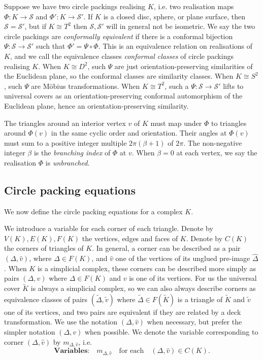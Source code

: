 \documentclass[12pt]{amsart}
\numberwithin{equation}{section}
\theoremstyle{named}
\newcommand{\To}{\longrightarrow}
\begin{document}
 Suppose we have two circle packings realising $K$, i.e. two realisation maps $\Phi \colon K \To \mathcal{S}$ and $\Phi' \colon K \To \mathcal{S}'$. If $K$ is a closed disc, sphere, or plane surface, then $\mathcal{S} = \mathcal{S}'$, but if $K \cong T^2$ then $\mathcal{S},\mathcal{S'}$ will in general not be isometric. We say the two circle packings are \emph{conformally equivalent} if there is a conformal bijection $\Psi \colon \mathcal{S} \To \mathcal{S'}$ such that $\Phi' = \Psi \circ \Phi$. This is an equivalence relation on realisations of $K$, and we call the equivalence classes \emph{conformal classes} of circle packings realising $K$. When $K \cong D^2$, such $\Psi$ are just orientation-preserving similarities of the Euclidean plane, so the conformal classes are similarity classes. When $K \cong S^2$, such $\Psi$ are M\"{o}bius transformations. When $K \cong T^2$, such a $\Psi \colon \mathcal{S} \To \mathcal{S}'$ lifts to universal covers as an orientation-preserving conformal automorphism of the Euclidean plane, hence an orientation-preserving similarity.

The triangles around an interior vertex $v$ of $K$ must map under $\Phi$ to triangles around $\Phi(v)$ in the same cyclic order and orientation. Their angles at $\Phi(v)$ must sum to a positive integer multiple $2\pi (\beta + 1)$ of $2\pi$. The non-negative integer $\beta$ is the \emph{branching index} of $\Phi$ at $v$. When $\beta = 0$ at each vertex, we say the realisation $\Phi$ is \emph{unbranched}.


\subsection{Circle packing equations}
\label{Sec:circle_packing_eqns}

 We now define the circle packing equations for a complex $K$. 

We introduce a variable for each corner of each triangle. Denote by $V(K), E(K), F(K)$ the vertices, edges and faces of $K$. Denote by $C(K)$ the corners of triangles of $K$. In general, a corner can be described as a pair $(\Delta, \widehat{v})$, where $\Delta \in F(K)$, and $\widehat{v}$ one of the vertices of its unglued pre-image $\widehat{\Delta}$. When $K$ is a simplicial complex, these corners can be described more simply as pairs $(\Delta, v)$ where $\Delta \in F(K)$ and $v$ is one of its vertices. For us the universal cover $\widetilde{K}$ is always a simplicial complex, so we can also always describe corners as equivalence classes of pairs $(\widetilde{\Delta}, \widetilde{v})$ where $\widetilde{\Delta} \in F(\widetilde{K})$ is a triangle of $\widetilde{K}$ and $\widetilde{v}$ one of its vertices, and two pairs are equivalent if they are related by a deck transformation. We use the notation $(\Delta, \widehat{v})$ when necessary, but prefer the simpler notation $(\Delta, v)$ when possible. We denote the variable corresponding to corner $(\Delta,\widehat{v})$ by $m_{\Delta,\widehat{v}}$, i.e.
\[
\textbf{Variables:} \quad
 m_{\Delta, \widehat{v}} 
\quad \text{for each} \quad 
 (\Delta, \widehat{v}) 
\in C(K).
\]
\end{document}
